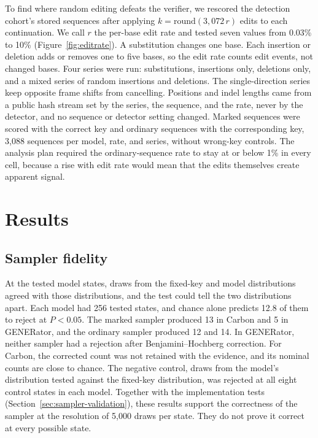 \documentclass[10pt,twocolumn]{article}
\begin{document}
To find where random editing defeats the verifier, we rescored the detection cohort's stored sequences
after applying $k = \mathrm{round}(3{,}072\,r)$ edits to each continuation. We call $r$ the
per-base edit rate and tested seven values from 0.03\% to 10\% (Figure~\ref{fig:editrate}). A
substitution changes one base. Each insertion or deletion adds or removes one to five bases, so the
edit rate counts edit events, not changed bases. Four series were run: substitutions, insertions
only, deletions only, and a mixed series of random insertions and deletions. The single-direction
series keep opposite frame shifts from cancelling. Positions and indel lengths came from a public
hash stream set by the series, the sequence, and the rate, never by the detector, and no sequence or
detector setting changed. Marked sequences were scored with the correct key and ordinary sequences with the
corresponding key, 3{,}088 sequences per model, rate, and series, without wrong-key controls. The
analysis plan required the ordinary-sequence rate to stay at or below 1\% in every cell, because a
rise with edit rate would mean that the edits themselves create apparent signal.

\section{Results}
\label{sec:results}

\subsection{Sampler fidelity}

At the tested model states, draws from the fixed-key and model distributions agreed with those
distributions, and the test could tell the two distributions apart. Each model had 256 tested
states, and chance alone predicts 12.8 of them to reject at $P < 0.05$. The marked sampler produced 13 in
Carbon and 5 in GENERator, and the ordinary sampler produced 12 and 14. In GENERator, neither
sampler had a rejection after Benjamini--Hochberg correction. For Carbon, the corrected count was
not retained with the evidence, and its nominal counts are close to chance. The negative control,
draws from the model's distribution tested against the fixed-key distribution, was rejected at all
eight control states in each model. Together with the implementation tests
(Section~\ref{sec:sampler-validation}), these results support the correctness of the sampler at
the resolution of 5{,}000 draws per state. They do not prove it correct at every possible state.
\end{document}
